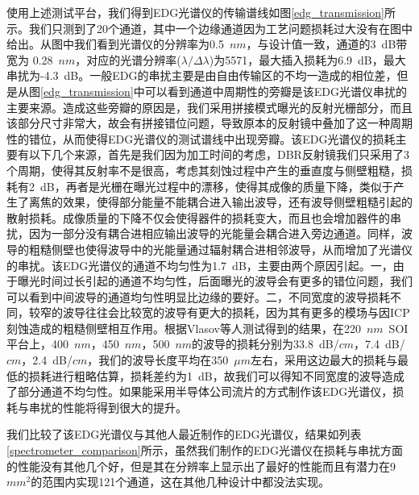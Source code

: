 使用上述测试平台，我们得到EDG光谱仪的传输谱线如图\ref{edg_transmission}所示。我们只测到了20个通道，其中一个边缘通道因为工艺问题损耗过大没有在图中给出。从图中我们看到光谱仪的分辨率为0.5~$nm$，与设计值一致，通道的3~dB带宽为
0.28~$nm$，对应的光谱分辨率($\lambda/\Delta\lambda$)为5571，最大插入损耗为6.9~dB，最大串扰为-4.3~dB。一般EDG的串扰主要是由自由传输区的不均一造成的相位差，但是从图\ref{edg_transmission}中可以看到通道中周期性的旁瓣是该EDG光谱仪串扰的主要来源。造成这些旁瓣的原因是，我们采用拼接模式曝光的反射光栅部分，而且该部分尺寸非常大，故会有拼接错位问题，导致原本的反射镜中叠加了这一种周期性的错位，从而使得EDG光谱仪的测试谱线中出现旁瓣\cite{he1998monolithic,xie2018silicon}。该EDG光谱仪的损耗主要有以下几个来源，首先是我们因为加工时间的考虑，DBR反射镜我们只采用了3个周期，使得其反射率不是很高，考虑其刻蚀过程中产生的垂直度与侧壁粗糙，损耗有2~dB，再者是光栅在曝光过程中的漂移，使得其成像的质量下降，类似于产生了离焦的效果，使得部分能量不能耦合进入输出波导，还有波导侧壁粗糙引起的散射损耗。成像质量的下降不仅会使得器件的损耗变大，而且也会增加器件的串扰，因为一部分没有耦合进相应输出波导的光能量会耦合进入旁边通道。同样，波导的粗糙侧壁也使得波导中的光能量通过辐射耦合进相邻波导，从而增加了光谱仪的串扰\cite{melati2014optical}。该EDG光谱仪的通道不均匀性为1.7~dB，主要由两个原因引起。一，由于曝光时间过长引起的通道不均匀性，后面曝光的波导会有更多的错位问题，我们可以看到中间波导的通道均匀性明显比边缘的要好。二，不同宽度的波导损耗不同，较窄的波导往往会比较宽的波导有更大的损耗，因为其有更多的模场与因ICP刻蚀造成的粗糙侧壁相互作用。根据Vlasov等人测试得到的结果，在220~$nm$~SOI平台上，400~$nm$，450~$nm$，500~$nm$的波导的损耗分别为33.8~dB/$cm$，7.4~dB/$cm$，2.4~dB/$cm$\cite{vlasov2004losses}，我们的波导长度平均在350~$\mu m$左右，采用这边最大的损耗与最低的损耗进行粗略估算，损耗差约为1~dB，故我们可以得知不同宽度的波导造成了部分通道不均匀性。如果能采用半导体公司流片的方式制作该EDG光谱仪，损耗与串扰的性能将得到很大的提升。

我们比较了该EDG光谱仪与其他人最近制作的EDG光谱仪，结果如列表\ref{spectrometer_comparison}所示，虽然我们制作的EDG光谱仪在损耗与串扰方面的性能没有其他几个好，但是其在分辨率上显示出了最好的性能而且有潜力在9 $mm^{2}$的范围内实现121个通道，这在其他几种设计中都没法实现。

